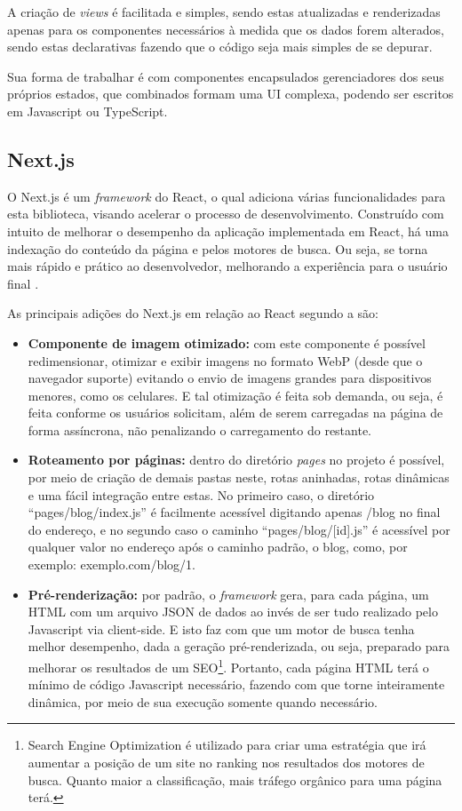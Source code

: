 A criação de \textit{views} é facilitada e simples, sendo estas atualizadas e renderizadas apenas para os componentes necessários à medida que os dados forem alterados, sendo estas declarativas fazendo que o código seja mais simples de se depurar.

Sua forma de trabalhar é com componentes encapsulados gerenciadores dos seus próprios estados, que combinados formam uma UI complexa, podendo ser escritos em Javascript ou TypeScript.

\subsection{Next.js}
O Next.js é um \textit{framework} do React, o qual adiciona várias funcionalidades para esta biblioteca, visando acelerar o processo de desenvolvimento. Construído com intuito de melhorar o desempenho da aplicação implementada em React, há uma indexação do conteúdo da página e pelos motores de busca. Ou seja, se torna mais rápido e prático ao desenvolvedor, melhorando a experiência para o usuário final \cite{KONSHIN}.

As principais adições do Next.js em relação ao React segundo a  são:
\begin{itemize}
    \item \textbf{Componente de imagem otimizado:} com este componente é possível redimensionar, otimizar e exibir imagens no formato WebP (desde que o navegador suporte) evitando o envio de imagens grandes para dispositivos menores, como os celulares. E tal otimização é feita sob demanda, ou seja, é feita conforme os usuários solicitam, além de serem carregadas na página de forma assíncrona, não penalizando o carregamento do restante.
    \item \textbf{Roteamento por páginas:} dentro do diretório \textit{pages} no projeto é possível, por meio de criação de demais pastas neste, rotas aninhadas, rotas dinâmicas e uma fácil integração entre estas. No primeiro caso, o diretório “pages/blog/index.js” é facilmente acessível digitando apenas /blog no final do endereço, e no segundo caso o caminho “pages/blog/[id].js” é acessível por qualquer valor no endereço após o caminho padrão, o blog, como, por exemplo: exemplo.com/blog/1.
    \item \textbf{Pré-renderização:} por padrão, o \textit{framework} gera, para cada página, um HTML com um arquivo JSON de dados ao invés de ser tudo realizado pelo Javascript via client-side. E isto faz com que um motor de busca tenha melhor desempenho, dada a geração pré-renderizada, ou seja, preparado para melhorar os resultados de um SEO\footnote{Search Engine Optimization é utilizado para criar uma estratégia que irá aumentar a posição de um site no ranking nos resultados dos motores de busca. Quanto maior a classificação, mais tráfego orgânico para uma página terá.}. Portanto, cada página HTML terá o mínimo de código Javascript necessário, fazendo com que torne inteiramente dinâmica, por meio de sua execução somente quando necessário.
\end{itemize}

